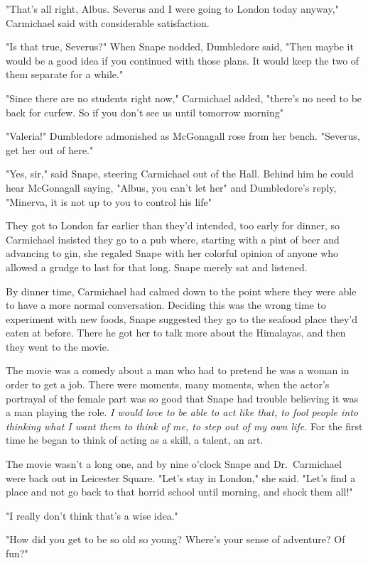 "That's all right, Albus. Severus and I were going to London today anyway," Carmichael said with considerable satisfaction.

"Is that true, Severus?" When Snape nodded, Dumbledore said, "Then maybe it would be a good idea if you continued with those plans. It would keep the two of them separate for a while."

"Since there are no students right now," Carmichael added, "there's no need to be back for curfew. So if you don't see us until tomorrow morning{\el}"

"Valeria!" Dumbledore admonished as McGonagall rose from her bench. "Severus, get her out of here."

"Yes, sir," said Snape, steering Carmichael out of the Hall. Behind him he could hear McGonagall saying, "Albus, you can't let her{\el}" and Dumbledore's reply, "Minerva, it is not up to you to control his life{\el}"

They got to London far earlier than they'd intended, too early for dinner, so Carmichael insisted they go to a pub where, starting with a pint of beer and advancing to gin, she regaled Snape with her colorful opinion of anyone who allowed a grudge to last for that long. Snape merely sat and listened.

By dinner time, Carmichael had calmed down to the point where they were able to have a more normal conversation. Deciding this was the wrong time to experiment with new foods, Snape suggested they go to the seafood place they'd eaten at before. There he got her to talk more about the Himalayas, and then they went to the movie.

The movie was a comedy about a man who had to pretend he was a woman in order to get a job. There were moments, many moments, when the actor's portrayal of the female part was so good that Snape had trouble believing it was a man playing the role. \emph{I would love to be able to act like that, to fool people into thinking what I want them to think of me, to step out of my own life.} For the first time he began to think of acting as a skill, a talent, an art.

The movie wasn't a long one, and by nine o'clock Snape and Dr.~Carmichael were back out in Leicester Square. "Let's stay in London," she said. "Let's find a place and not go back to that horrid school until morning, and shock them all!"

"I really don't think that's a wise idea."

"How did you get to be so old so young? Where's your sense of adventure? Of fun?"

